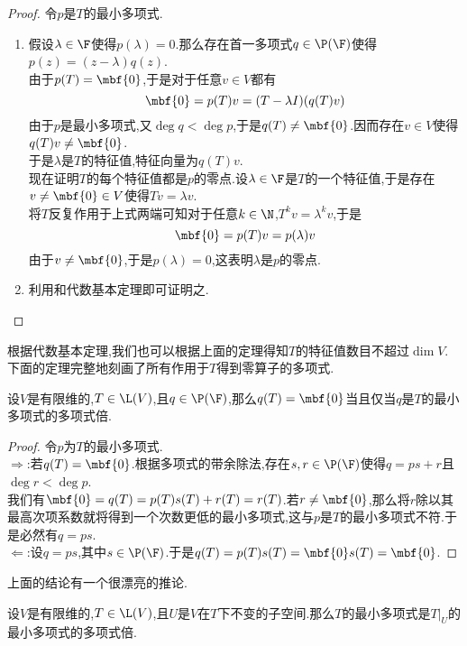 \documentclass{ctexart}
\begin{document}
\begin{proof}
    令$p$是$T$的最小多项式.
    \begin{enumerate}[label=\tbf{(\alph*)}]
        \item 假设$\lambda\in\F$使得$p(\lambda)=0$.那么存在首一多项式$q\in\P(\F)$使得$p(z)=(z-\lambda)q(z)$.\\
            由于$p(T)=\mbf{0}$,于是对于任意$v\in V$都有
            $$\mbf{0}=p(T)v=(T-\lambda I)(q(T)v)$$
            由于$p$是最小多项式,又$\deg q<\deg p$,于是$q(T)\neq\mbf{0}$.因而存在$v\in V$使得$q(T)v\neq\mbf{0}$.\\
            于是$\lambda$是$T$的特征值,特征向量为$q(T)v$.\\
            现在证明$T$的每个特征值都是$p$的零点.设$\lambda\in\F$是$T$的一个特征值,于是存在$v\neq\mbf{0}\in V$使得$Tv=\lambda v$.\\
            将$T$反复作用于上式两端可知对于任意$k\in\N$,$T^kv=\lambda^kv$,于是
            $$\mbf{0}=p(T)v=p(\lambda)v$$
            由于$v\neq\mbf{0}$,于是$p(\lambda)=0$,这表明$\lambda$是$p$的零点.
        \item 利用和代数基本定理即可证明之.
    \end{enumerate}
\end{proof}\noindent
根据代数基本定理,我们也可以根据上面的定理得知$T$的特征值数目不超过$\dim V$.\\
下面的定理完整地刻画了所有作用于$T$得到零算子的多项式.
\begin{formal}[2.5 得到零算子的多项式]
    设$V$是有限维的,$T\in\L(V)$,且$q\in\P(\F)$,那么$q(T)=\mbf{0}$当且仅当$q$是$T$的最小多项式的多项式倍.
\end{formal}
\begin{proof}
    令$p$为$T$的最小多项式.\\
    $\Rightarrow$:若$q(T)=\mbf{0}$.根据多项式的带余除法,存在$s,r\in\P(\F)$使得$q=ps+r$且$\deg r<\deg p$.\\
    我们有$\mbf{0}=q(T)=p(T)s(T)+r(T)=r(T)$.若$r\neq\mbf{0}$,那么将$r$除以其最高次项系数就将得到一个次数更低的最小多项式,这与$p$是$T$的最小多项式不符.于是必然有$q=ps$.\\
    $\Leftarrow$:设$q=ps$,其中$s\in\P(\F)$.于是$q(T)=p(T)s(T)=\mbf{0}s(T)=\mbf{0}$.
\end{proof}\noindent
上面的结论有一个很漂亮的推论.
\begin{formal}[2.6 受限算子的最小多项式]
    设$V$是有限维的,$T\in\L(V)$,且$U$是$V$在$T$下不变的子空间.那么$T$的最小多项式是$T\vert_U$的最小多项式的多项式倍.
\end{formal}
\end{document}
